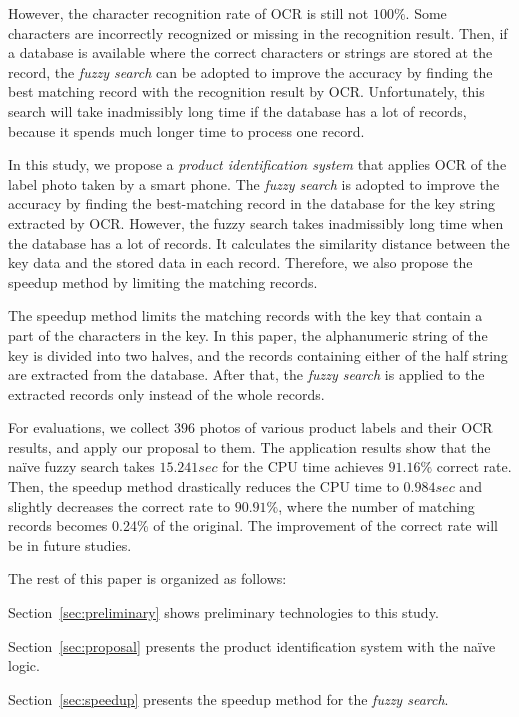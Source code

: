 \documentclass[technicalreport]{ieicej}
\begin{document}
    However, the character recognition rate of OCR is still not $100\%$. Some characters are incorrectly recognized or missing in the recognition result. Then, if a database is available where the correct characters or strings are stored at the record, the {\em fuzzy search} can be adopted to improve the accuracy by finding the best matching record with the recognition result by OCR. Unfortunately, this search will take inadmissibly long time if the database has a lot of records, because it spends much longer time to process one record. 

    In this study, we propose a {\em product identification system} that applies OCR of the label photo taken by a smart phone. The {\em fuzzy search} is adopted to improve the accuracy by finding the best-matching record in the database for the key string extracted by OCR. However, the fuzzy search takes inadmissibly long time when the database has a lot of records. It calculates the similarity distance between the key data and the stored data in each record. Therefore, we also propose the speedup method by limiting the matching records. 

    The speedup method limits the matching records with the key that contain a part of the characters in the key. In this paper, the alphanumeric string of the key is divided into two halves, and the records containing either of the half string are extracted from the database. After that, the {\em fuzzy search} is applied to the extracted records only instead of the whole records. 

    For evaluations, we collect $396$ photos of various product labels and their OCR results, and apply our proposal to them. The application results show that the naïve fuzzy search takes $15.241sec$ for the CPU time achieves $91.16\%$ correct rate. Then, the speedup method drastically reduces the CPU time to $0.984sec$ and slightly decreases the correct rate to $90.91\%$, where the number of matching records becomes 0.24\% of the original. The improvement of the correct rate will be in future studies.

    The rest of this paper is organized as follows:

    Section~\ref{sec:preliminary} shows preliminary technologies to this study.

    Section~\ref{sec:proposal} presents the product identification system with the naïve logic.

    Section~\ref{sec:speedup} presents the speedup method for the {\em fuzzy search}.
\end{document}
